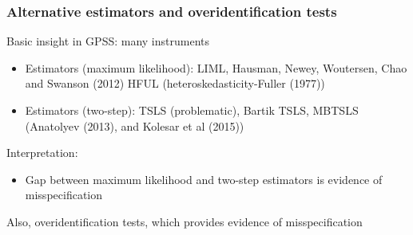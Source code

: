 \documentclass[notes,11pt, aspectratio=169]{beamer}
\begin{document}

\begin{frame}[label=overidtest]
\frametitle{Alternative estimators and overidentification tests}

Basic insight in GPSS: many instruments 
\begin{itemize}
\item Estimators (maximum likelihood): LIML, Hausman, Newey, Woutersen, Chao and Swanson (2012) HFUL (heteroskedasticity-Fuller (1977))
\item Estimators (two-step):  TSLS (problematic), Bartik TSLS, MBTSLS (Anatolyev (2013), and Kolesar et al (2015)) 
\end{itemize} 
Interpretation:
\begin{itemize}
\item Gap between maximum likelihood and two-step estimators is evidence of misspecification 
\end{itemize}
Also, overidentification tests, which provides evidence of misspecification
%

\end{frame}

\end{document}
